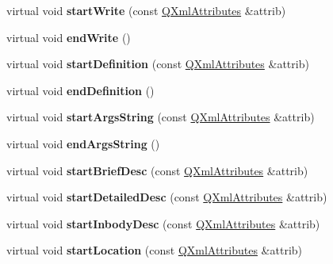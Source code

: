 \begin{DoxyCompactItemize}
virtual void {\bfseries start\+Write} (const \mbox{\hyperlink{class_q_xml_attributes}{Q\+Xml\+Attributes}} \&attrib)
\item 
\mbox{\label{class_member_handler_a519015ed38bdcd6040547efca7216cdc}} 
virtual void {\bfseries end\+Write} ()
\item 
\mbox{\label{class_member_handler_a0b51ae8bf755af4271ca2386fb575d5d}} 
virtual void {\bfseries start\+Definition} (const \mbox{\hyperlink{class_q_xml_attributes}{Q\+Xml\+Attributes}} \&attrib)
\item 
\mbox{\label{class_member_handler_a24f695c3c4cbcdde30aca405df44dbe3}} 
virtual void {\bfseries end\+Definition} ()
\item 
\mbox{\label{class_member_handler_a4256a8af700a6e5d1c4db24aa51cbb36}} 
virtual void {\bfseries start\+Args\+String} (const \mbox{\hyperlink{class_q_xml_attributes}{Q\+Xml\+Attributes}} \&attrib)
\item 
\mbox{\label{class_member_handler_a4473738c1be083b63b6f6695c7487a71}} 
virtual void {\bfseries end\+Args\+String} ()
\item 
\mbox{\label{class_member_handler_a53b51de75e642fc36a8f1d22a5bf0f75}} 
virtual void {\bfseries start\+Brief\+Desc} (const \mbox{\hyperlink{class_q_xml_attributes}{Q\+Xml\+Attributes}} \&attrib)
\item 
\mbox{\label{class_member_handler_a30d5acaa77423be754a33c9f3895ae19}} 
virtual void {\bfseries start\+Detailed\+Desc} (const \mbox{\hyperlink{class_q_xml_attributes}{Q\+Xml\+Attributes}} \&attrib)
\item 
\mbox{\label{class_member_handler_a05149ac563ad8f9ea682e35d41d7ebc7}} 
virtual void {\bfseries start\+Inbody\+Desc} (const \mbox{\hyperlink{class_q_xml_attributes}{Q\+Xml\+Attributes}} \&attrib)
\item 
\mbox{\label{class_member_handler_ac68169d60ab0111a719e7f3a71c9c346}} 
virtual void {\bfseries start\+Location} (const \mbox{\hyperlink{class_q_xml_attributes}{Q\+Xml\+Attributes}} \&attrib)

\end{DoxyCompactItemize}
